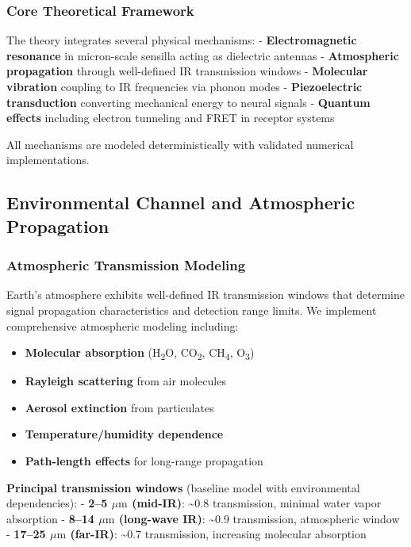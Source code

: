 \documentclass[
  13pt,
  a4paperpaper,
  12pt]{article}
\providecommand{\tightlist}{%
  \setlength{\itemsep}{0pt}\setlength{\parskip}{0pt}}
\begin{document}
\subsubsection{Core Theoretical
Framework}\label{core-theoretical-framework}

The theory integrates several physical mechanisms: -
\textbf{Electromagnetic resonance} in micron-scale sensilla acting as
dielectric antennas - \textbf{Atmospheric propagation} through
well-defined IR transmission windows - \textbf{Molecular vibration}
coupling to IR frequencies via phonon modes - \textbf{Piezoelectric
transduction} converting mechanical energy to neural signals -
\textbf{Quantum effects} including electron tunneling and FRET in
receptor systems

All mechanisms are modeled deterministically with validated numerical
implementations.

\subsection{Environmental Channel and Atmospheric
Propagation}\label{environmental-channel-and-atmospheric-propagation}

\subsubsection{Atmospheric Transmission
Modeling}\label{atmospheric-transmission-modeling}

Earth's atmosphere exhibits well-defined IR transmission windows that
determine signal propagation characteristics and detection range limits.
We implement comprehensive atmospheric modeling including:

\begin{itemize}
\tightlist
\item
  \textbf{Molecular absorption} (H\textsubscript{2}O,
  CO\textsubscript{2}, CH\textsubscript{4}, O\textsubscript{3})
\item
  \textbf{Rayleigh scattering} from air molecules
\item
  \textbf{Aerosol extinction} from particulates
\item
  \textbf{Temperature/humidity dependence}
\item
  \textbf{Path-length effects} for long-range propagation
\end{itemize}

\textbf{Principal transmission windows} (baseline model with
environmental dependencies): - \textbf{2--5 \(\mu\mathrm{m}\) (mid-IR)}:
\textasciitilde0.8 transmission, minimal water vapor absorption -
\textbf{8--14 \(\mu\mathrm{m}\) (long-wave IR)}: \textasciitilde0.9
transmission, atmospheric window - \textbf{17--25 \(\mu\mathrm{m}\)
(far-IR)}: \textasciitilde0.7 transmission, increasing molecular
absorption
\end{document}

